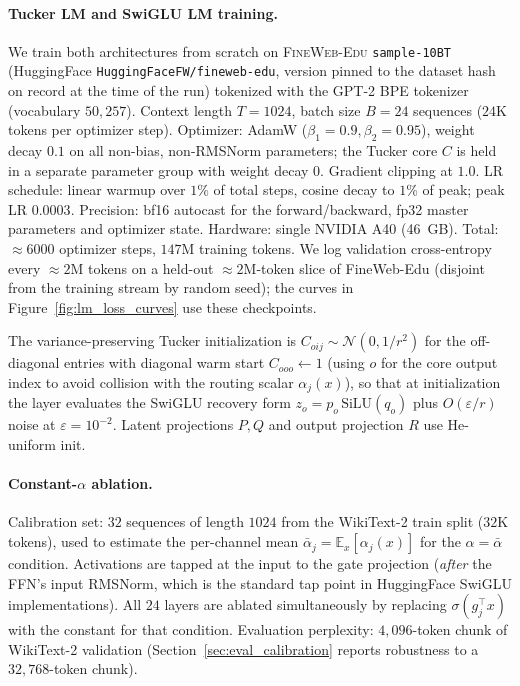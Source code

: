 \paragraph{Tucker LM and SwiGLU LM training.}
We train both architectures from scratch on \textsc{FineWeb-Edu}
\texttt{sample-10BT} (HuggingFace
\texttt{HuggingFaceFW/fineweb-edu}, version pinned to the dataset hash on
record at the time of the run) tokenized with the GPT-2 BPE tokenizer
(vocabulary $50{,}257$). Context length $T{=}1024$,
batch size $B{=}24$ sequences
($24$K tokens per optimizer step). Optimizer:
AdamW ($\beta_1{=}0.9, \beta_2{=}0.95$), weight decay $0.1$ on all
non-bias, non-RMSNorm parameters; the Tucker core $C$ is held in a
separate parameter group with weight decay $0$. Gradient clipping at $1.0$.
LR schedule: linear warmup over $1\%$ of total steps, cosine decay to $1\%$
of peak; peak LR $0.0003$. Precision: bf16 autocast for the
forward/backward, fp32 master parameters and optimizer state.
Hardware: single NVIDIA A40 (46~GB).
Total: $\approx6000$ optimizer steps,
$147$M training tokens.
We log validation cross-entropy every $\approx 2$M tokens on a held-out
$\approx 2$M-token slice of FineWeb-Edu (disjoint from the training stream
by random seed); the curves in Figure~\ref{fig:lm_loss_curves} use these
checkpoints.

The variance-preserving Tucker initialization is
$C_{oij} \sim \mathcal{N}(0, 1/r^2)$ for the off-diagonal entries with
diagonal warm start $C_{ooo} \leftarrow 1$ (using $o$ for the core output
index to avoid collision with the routing scalar $\alpha_j(x)$), so that at
initialization the layer evaluates the SwiGLU recovery form
$z_o = p_o\,\mathrm{SiLU}(q_o)$ plus $O(\varepsilon/r)$ noise at
$\varepsilon{=}10^{-2}$. Latent projections $P, Q$ and output projection
$R$ use He-uniform init.

\paragraph{Constant-$\alpha$ ablation.}
Calibration set: $32$ sequences of length $1024$ from the WikiText-2 train
split ($32$K tokens), used to estimate the per-channel mean
$\bar\alpha_j = \mathbb{E}_x[\alpha_j(x)]$ for the
$\alpha\!=\!\bar\alpha$ condition. Activations are tapped at the input to the
gate projection (\textit{after} the FFN's input RMSNorm, which is the
standard tap point in HuggingFace SwiGLU implementations). All $24$ layers
are ablated simultaneously by replacing $\sigma(g_j^\top x)$ with the
constant for that condition. Evaluation perplexity: $4{,}096$-token chunk
of WikiText-2 validation (Section~\ref{sec:eval_calibration} reports
robustness to a $32{,}768$-token chunk).

